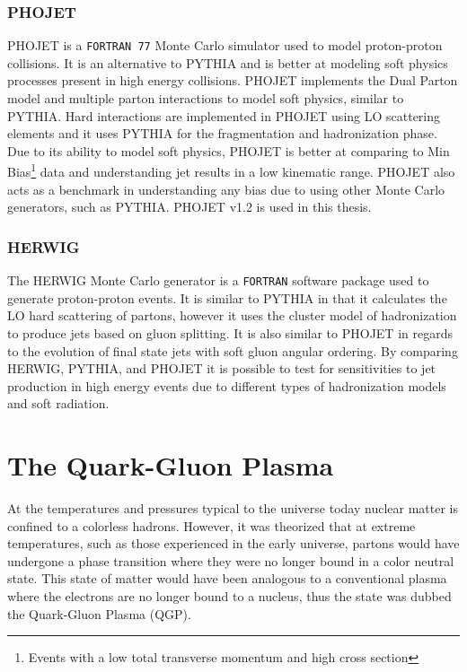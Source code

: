 \subsubsection{PHOJET}
PHOJET is a \verb|FORTRAN 77| Monte Carlo simulator used to model proton-proton collisions. It is an alternative to PYTHIA and is better at modeling soft physics processes present in high energy collisions.   PHOJET implements the Dual Parton model\cite{CAPELLA1994225}\cite{Wong:241251} and multiple parton interactions\cite{Bopp:1998rc} to model soft physics, similar to PYTHIA.  Hard interactions are implemented in PHOJET using LO scattering elements and it uses PYTHIA for the fragmentation and hadronization phase.  Due to its ability to model soft physics, PHOJET is better at comparing to Min Bias\footnote{Events with a low total transverse momentum and high cross section} data and understanding jet results in a low kinematic range.  PHOJET also acts as a benchmark in understanding any bias due to using other Monte Carlo generators, such as PYTHIA.  PHOJET v1.2 is used in this thesis.


\subsubsection{HERWIG}
The HERWIG\cite{Bahr:2008pv} Monte Carlo generator is a \verb|FORTRAN| software package used to generate proton-proton events.  It is similar to PYTHIA in that it calculates the LO hard scattering of partons, however it uses the cluster model of hadronization to produce jets based on gluon splitting.  It is also similar to PHOJET in regards to the evolution of final state jets with soft gluon angular ordering.  By comparing HERWIG, PYTHIA, and PHOJET it is possible to test for sensitivities to jet production in high energy events due to different types of hadronization models and soft radiation.


\section{The Quark-Gluon Plasma}
At the temperatures and pressures typical to the universe today nuclear matter is confined to a colorless hadrons.  However, it was theorized that at extreme temperatures, such as those experienced in the early universe, partons would have undergone a phase transition where they were no longer bound in a color neutral state.  This state of matter would have been analogous to a conventional plasma where the electrons are no longer bound to a nucleus, thus the state was dubbed the Quark-Gluon Plasma (QGP).

